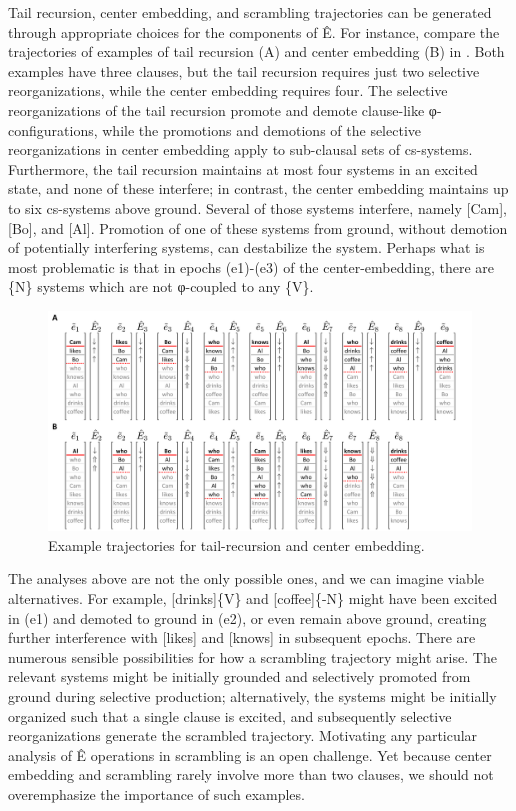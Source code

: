   Tail recursion, center embedding, and scrambling trajectories can be generated through appropriate choices for the components of Ê. For instance, compare the trajectories of examples of tail recursion (A) and center embedding (B) in {}. Both examples have three clauses, but the tail recursion requires just two selective reorganizations, while the center embedding requires four. The selective reorganizations of the tail recursion promote and demote clause-like φ-configurations, while the promotions and demotions of the selective reorganizations in center embedding apply to sub-clausal sets of cs-systems. Furthermore, the tail recursion maintains at most four systems in an excited state, and none of these interfere; in contrast, the center embedding maintains up to six cs-systems above ground. Several of those systems interfere, namely [Cam], [Bo], and [Al]. Promotion of one of these systems from ground, without demotion of potentially interfering systems, can destabilize the system. Perhaps what is most problematic is that in epochs (e1)-(e3) of the center-embedding, there are \{N\} systems which are not φ-coupled to any \{V\}.

  
\begin{figure}
\includegraphics[width=\textwidth]{figures/Tilsen-img119.png}
\caption{Example trajectories for tail-recursion and center embedding.}
\label{fig:5:15}
\end{figure}
 
   The analyses above are not the only possible ones, and we can imagine viable alternatives. For example, [drinks]\{V\} and [coffee]\{-N\} might have been excited in (e1) and demoted to ground in (e2), or even remain above ground, creating further interference with [likes] and [knows] in subsequent epochs. There are numerous sensible possibilities for how a scrambling trajectory might arise. The relevant systems might be initially grounded and selectively promoted from ground during selective production; alternatively, the systems might be initially organized such that a single clause is excited, and subsequently selective reorganizations generate the scrambled trajectory. Motivating any particular analysis of Ê operations in scrambling is an open challenge. Yet because center embedding and scrambling rarely involve more than two clauses, we should not overemphasize the importance of such examples.

